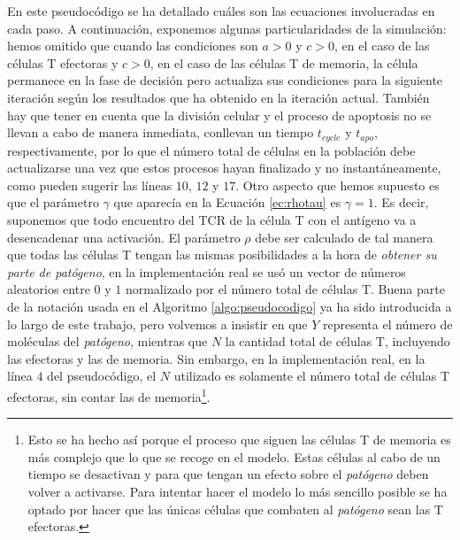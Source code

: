 En este pseudocódigo se ha detallado cuáles son las ecuaciones involucradas en cada paso. A continuación, exponemos algunas particularidades de la simulación: hemos omitido que cuando las condiciones son $a > 0$ y $c > 0$, en el caso de las células T efectoras y $c > 0$, en el caso de las células T de memoria, la célula permanece en la fase de decisión pero actualiza sus condiciones para la siguiente iteración según los resultados que ha obtenido en la iteración actual. También hay que tener en cuenta que la división celular y el proceso de apoptosis no se llevan a cabo de manera inmediata, conllevan un tiempo $t_{cycle}$ y $t_{apo}$, respectivamente, por lo que el número total de células en la población debe actualizarse una vez que estos procesos hayan finalizado y no instantáneamente, como pueden sugerir las líneas $10$, $12$ y $17$. Otro aspecto que hemos supuesto es que el parámetro $\gamma$ que aparecía en la Ecuación \ref{ec:rhotau} es $\gamma = 1$. Es decir, suponemos que todo encuentro del TCR de la célula T con el antígeno va a desencadenar una activación. El parámetro $\rho$ debe ser calculado de tal manera que todas las células T tengan las mismas posibilidades a la hora de \textit{obtener su parte de \textit{patógeno}}, en la implementación real se usó un vector de números aleatorios entre $0$ y $1$ normalizado por el número total de células T. Buena parte de la notación usada en el Algoritmo \ref{algo:pseudocodigo} ya ha sido introducida a lo largo de este trabajo, pero volvemos a insistir en que $Y$ representa el número de moléculas del \textit{patógeno}, mientras que $N$ la cantidad total de células T, incluyendo las efectoras y las de memoria. Sin embargo, en la implementación real, en la línea $4$ del pseudocódigo, el $N$ utilizado es solamente el número total de células T efectoras, sin contar las de memoria\footnote{Esto se ha hecho así porque el proceso que siguen las células T de memoria es más complejo que lo que se recoge en el modelo. Estas células al cabo de un tiempo se desactivan y para que tengan un efecto sobre el \textit{patógeno} deben volver a activarse. Para intentar hacer el modelo lo más sencillo posible se ha optado por hacer que las únicas células que combaten al \textit{patógeno} sean las T efectoras.}.


